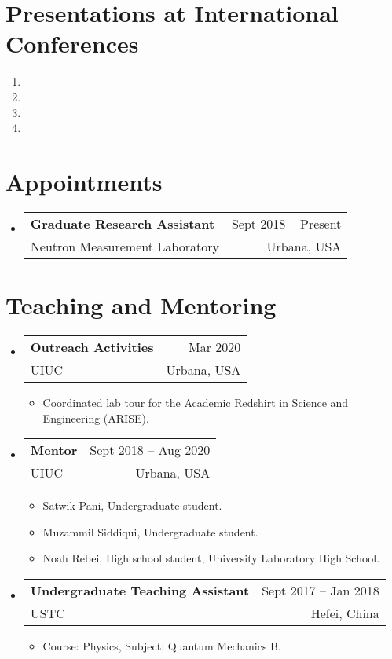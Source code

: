 \documentclass[letterpaper,11pt]{article} %
\makeatletter
\newcommand{\CVItem}[1]{
  \item\small{
    {#1 \vspace{-2pt}}
  }
}
\newcommand{\CVSubheading}[4]{
  \vspace{-2pt}\item
    \begin{tabular*}{0.97\textwidth}[t]{l@{\extracolsep{\fill}}r}
      \textbf{#1} & #2 \\
      \small#3 & \small #4 \\
    \end{tabular*}\vspace{-7pt}
}
\newcommand{\CVSubHeadingListStart}{\begin{itemize}[leftmargin=0.5cm, label={}]}
\newcommand{\CVSubHeadingListEnd}{\end{itemize}}
\newcommand{\CVItemListStart}{\begin{itemize}}
\newcommand{\CVItemListEnd}{\end{itemize}\vspace{-5pt}}
\makeatother
\begin{document}
\begin{comment}
Again the title should have already been enough, but if it is necessary to add
descriptions maintain the consistency from prior sections
\end{comment}
\section{Presentations at International Conferences}
    \begin{enumerate}
        \item {}
        \item {}
        \item {}
        \item {}
    \end{enumerate}
 
\begin{comment}
Section is here as it applied to my application for positions in academia. 
Remember to tailor the resume for to the position.
\end{comment}
\section{Appointments}
\CVSubHeadingListStart
    \CVSubheading
      {Graduate Research Assistant}{Sept 2018 – Present}
      {Neutron Measurement Laboratory}{Urbana, USA}
  \CVSubHeadingListEnd

\section{Teaching and Mentoring}
\CVSubHeadingListStart
    \CVSubheading
      {Outreach Activities}{Mar 2020}
      {UIUC}{Urbana, USA}
      \CVItemListStart
        \CVItem{Coordinated lab tour for the Academic Redshirt in Science and Engineering (ARISE).}
      \CVItemListEnd
    \CVSubheading
      {Mentor}{Sept 2018 – Aug 2020}
      {UIUC}{Urbana, USA}
      \CVItemListStart
        \CVItem{Satwik Pani, Undergraduate student.}
        \CVItem{Muzammil Siddiqui, Undergraduate student.}
        \CVItem{Noah Rebei, High school student, University Laboratory High School.}
      \CVItemListEnd
    \CVSubheading
      {Undergraduate Teaching Assistant}{Sept 2017 – Jan 2018}
      {USTC}{Hefei, China}
      \CVItemListStart
        \CVItem{Course: Physics, Subject: Quantum Mechanics B.}
      \CVItemListEnd
  \CVSubHeadingListEnd
\end{document}
